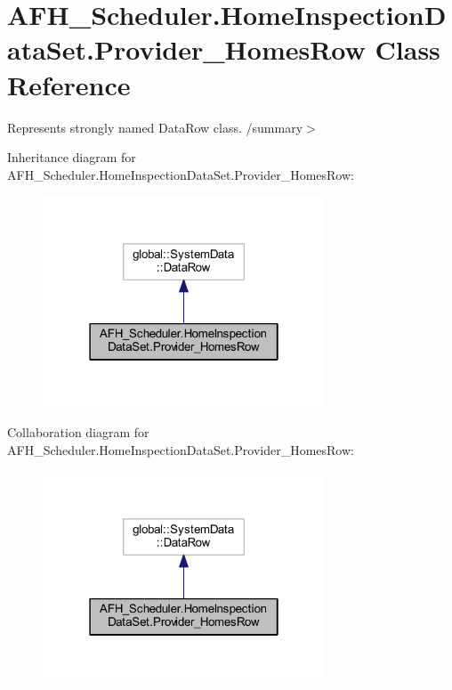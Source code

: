 \section{A\+F\+H\+\_\+\+Scheduler.\+Home\+Inspection\+Data\+Set.\+Provider\+\_\+\+Homes\+Row Class Reference}
\label{class_a_f_h___scheduler_1_1_home_inspection_data_set_1_1_provider___homes_row}


Represents strongly named Data\+Row class. /summary$>$  




Inheritance diagram for A\+F\+H\+\_\+\+Scheduler.\+Home\+Inspection\+Data\+Set.\+Provider\+\_\+\+Homes\+Row\+:
\nopagebreak
\begin{figure}[H]
\begin{center}
\leavevmode
\includegraphics[width=238pt]{class_a_f_h___scheduler_1_1_home_inspection_data_set_1_1_provider___homes_row__inherit__graph}
\end{center}
\end{figure}


Collaboration diagram for A\+F\+H\+\_\+\+Scheduler.\+Home\+Inspection\+Data\+Set.\+Provider\+\_\+\+Homes\+Row\+:
\nopagebreak
\begin{figure}[H]
\begin{center}
\leavevmode
\includegraphics[width=238pt]{class_a_f_h___scheduler_1_1_home_inspection_data_set_1_1_provider___homes_row__coll__graph}
\end{center}
\end{figure}
